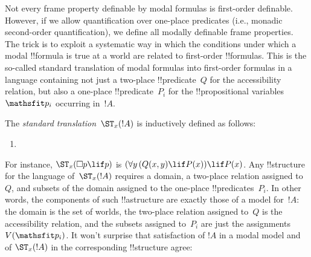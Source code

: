 \documentclass[../../../include/open-logic-section]{subfiles}
\begin{document}


Not every frame property definable by modal formulas is first-order
definable. However, if we allow quantification over one-place
predicates (i.e., monadic second-order quantification), we define all
modally definable frame properties. The trick is to exploit a
systematic way in which the conditions under which a modal !!{formula}
is true at a world are related to first-order !!{formula}s. This is
the so-called standard translation of modal formulas into first-order
formulas in a language containing not just a two-place
!!{predicate}~$Q$ for the accessibility relation, but also a one-place
!!{predicate}~$P_i$ for the !!{propositional variable}s~$\Obj p_i$
occurring in~$!A$.

\begin{defn}
  The \emph{standard translation}~$\ST_x(!A)$ is inductively defined
  as follows:
  \begin{enumerate}
  \item {}
  \end{enumerate}
\end{defn}

For instance, $\ST_x(\Box p \lif p)$ is $(\lforall[y][(\Atom{Q}{x,y}
  \lif \Atom{P}{x})] \lif \Atom{P}{x}$. Any !!{structure} for the
language of~$\ST_x(!A)$ requires a domain, a two-place relation
assigned to~$Q$, and subsets of the domain assigned to the one-place
!!{predicate}s~$P_i$. In other words, the components of such
!!a{structure} are exactly those of a model for~$!A$: the domain is
the set of worlds, the two-place relation assigned to~$Q$ is the
accessibility relation, and the subsets assigned to~$P_i$ are just the
assignments~$V(\Obj p_i)$. It won't surprise that satisfaction of $!A$
in a modal model and of $\ST_x(!A)$ in the corresponding !!{structure}
agree:
\end{document}
